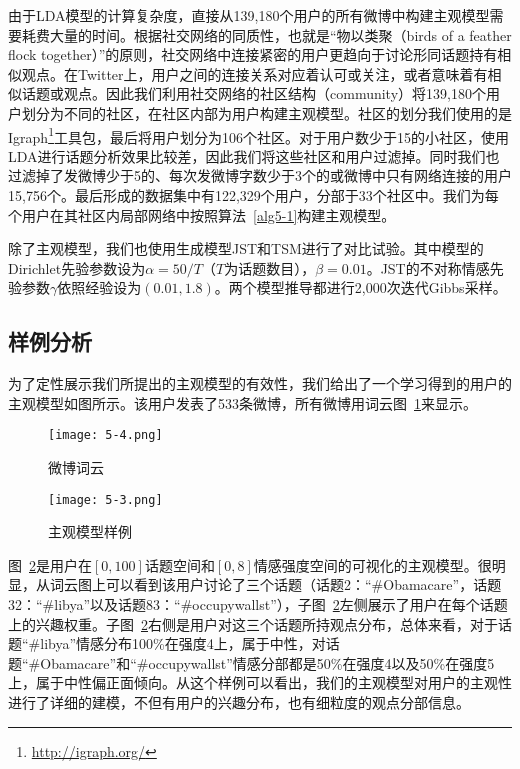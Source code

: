 由于LDA模型的计算复杂度，直接从139,180个用户的所有微博中构建主观模型需要耗费大量的时间。根据社交网络的同质性，也就是“物以类聚（birds of a feather flock together）”的原则，社交网络中连接紧密的用户更趋向于讨论形同话题持有相似观点。在Twitter上，用户之间的连接关系对应着认可或关注，或者意味着有相似话题或观点。因此我们利用社交网络的社区结构（community）将139,180个用户划分为不同的社区，在社区内部为用户构建主观模型。社区的划分我们使用的是
Igraph\footnote{\url{http://igraph.org/}}工具包，最后将用户划分为106个社区。对于用户数少于15的小社区，使用LDA进行话题分析效果比较差，因此我们将这些社区和用户过滤掉。同时我们也过滤掉了发微博少于5的、每次发微博字数少于3个的或微博中只有网络连接的用户15,756个。最后形成的数据集中有122,329个用户，分部于33个社区中。我们为每个用户在其社区内局部网络中按照算法~\ref{alg5-1}构建主观模型。

除了主观模型，我们也使用生成模型JST和TSM进行了对比试验。其中模型的Dirichlet先验参数设为$ \alpha=50/T $（$ T $为话题数目），$ \beta=0.01 $。JST的不对称情感先验参数$ \gamma $依照经验设为$ (0.01, 1.8) $。两个模型推导都进行2,000次迭代Gibbs采样。

\subsection{样例分析}
为了定性展示我们所提出的主观模型的有效性，我们给出了一个学习得到的用户的主观模型如图所示。该用户发表了533条微博，所有微博用词云图~\ref{fig5:a}来显示。

\begin{figure}[htb]
\centering
\texttt{[image: 5-4.png]}
\caption{微博词云}
\label{fig5:a}
\end{figure}

\begin{figure}[htb]
\centering
\texttt{[image: 5-3.png]}
\caption{主观模型样例}
\label{fig5:b}
\end{figure}
图~\ref{fig5:b}是用户在$ [0,100] $话题空间和$ [0,8] $情感强度空间的可视化的主观模型。很明显，从词云图上可以看到该用户讨论了三个话题（话题2：``\#Obamacare''，话题32：``\#libya''以及话题83：``\#occupywallst''），子图~\ref{fig5:b}左侧展示了用户在每个话题上的兴趣权重。子图~\ref{fig5:b}右侧是用户对这三个话题所持观点分布，总体来看，对于话题``\#libya''情感分布100\%在强度4上，属于中性，对话题``\#Obamacare''和``\#occupywallst''情感分部都是50\%在强度4以及50\%在强度5上，属于中性偏正面倾向。从这个样例可以看出，我们的主观模型对用户的主观性进行了详细的建模，不但有用户的兴趣分布，也有细粒度的观点分部信息。

